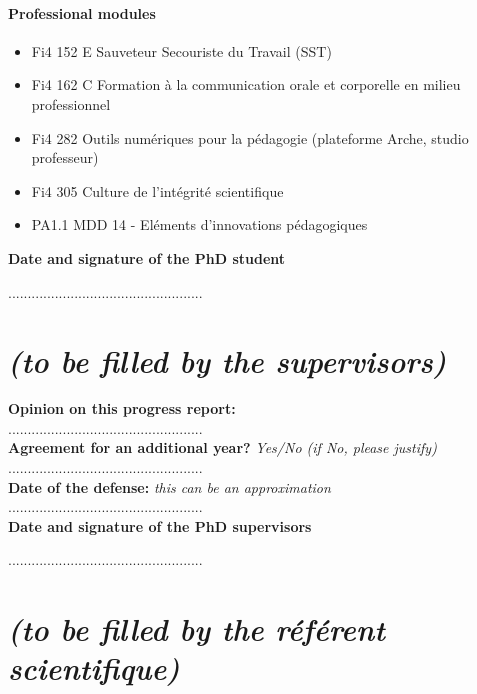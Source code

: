 \documentclass[12pt]{article}
\newcommand{\commentaire}[1]{\small\textit{#1}}
\begin{document}
\paragraph{\footnotesize Professional modules}
  \begin{itemize}
      \itemsep0em
      \item Fi4 152 E Sauveteur Secouriste du Travail (SST)
      \item Fi4 162 C Formation à la communication orale et corporelle en milieu professionnel
      \item Fi4 282 Outils numériques pour la pédagogie (plateforme Arche, studio professeur)
      \item Fi4 305 Culture de l’intégrité scientifique
      \item PA1.1 MDD 14 - Eléments d’innovations pédagogiques
  \end{itemize}

\noindent\textbf{Date and signature of the PhD student}

..................................................


\newpage
\section*{ \textit{\small (to be filled by the supervisors)}}

\noindent\textbf{Opinion on this progress report:}\\
..................................................
\\

\noindent\textbf{Agreement for an additional year?}
\commentaire{%
  Yes/No (if No, please justify)\\}
..................................................
\\

\noindent\textbf{Date of the defense:}
\commentaire{%
  this can be an approximation\\}
..................................................
\\


\noindent\textbf{Date and signature of the PhD supervisors}

..................................................

\newpage
\section*{ \textit{\small (to be filled by the ré\-fé\-rent scientifique)}}
\end{document}
